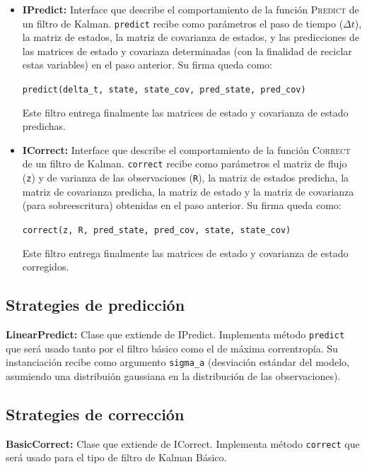 \begin{itemize}
\item \textbf{IPredict:} Interface que describe el comportamiento de la funci\'on \textsc{Predict} de un filtro de Kalman. \texttt{predict} recibe como par\'ametros el paso de tiempo ($\Delta t$), la matriz de estados, la matriz de covarianza de estados, y las predicciones de las matrices de estado y covariaza determinadas (con la finalidad de reciclar estas variables) en el paso anterior. Su firma queda como:
\begin{center}
\texttt{predict(delta\_t, state, state\_cov, pred\_state, pred\_cov)}
\end{center}
Este filtro entrega finalmente las matrices de estado y covarianza de estado predichas.
\bigskip

\item \textbf{ICorrect:} Interface que describe el comportamiento de la funci\'on \textsc{Correct} de un filtro de Kalman. \texttt{correct} recibe como par\'ametros el matriz de flujo (\texttt{z}) y de varianza de las observaciones (\texttt{R}), la matriz de estados predicha, la matriz de covarianza predicha, la matriz de estado y la matriz de covarianza (para sobreescritura) obtenidas en el paso anterior. Su firma queda como:
\begin{center}
\texttt{correct(z, R, pred\_state, pred\_cov, state, state\_cov)}
\end{center}
\bigskip
Este filtro entrega finalmente las matrices de estado y covarianza de estado corregidos.

\end{itemize}

\subsection{Strategies de predicci\'on}
\textbf{LinearPredict:} Clase que extiende de IPredict. Implementa m\'etodo \texttt{predict} que ser\'a usado tanto por el filtro b\'asico como el de m\'axima correntrop\'ia. Su instanciaci\'on recibe como argumento \texttt{sigma\_a} (desviaci\'on est\'andar del modelo, asumiendo una distribui\'on gaussiana en la distribuci\'on de las observaciones).
\bigskip


\subsection{Strategies de correcci\'on}
\textbf{BasicCorrect:} Clase que extiende de ICorrect. Implementa m\'etodo \texttt{correct} que ser\'a usado para el tipo de filtro de Kalman B\'asico.
\bigskip

